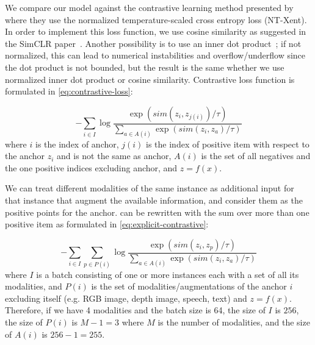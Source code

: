 \documentclass[10pt]{article} %
\newcommand{\todokdinline}[1]{\todo[color=red!20,inline]{{KD: \small #1}}}
\begin{document}
We compare our model against the contrastive learning method presented by~\citet{chen2020simple} where they use the normalized
temperature-scaled cross entropy loss (NT-Xent). In order to implement this loss function, we use cosine similarity as suggested in the SimCLR paper~\citep{chen2020simple}. Another possibility is to use an inner dot product~\citep{NEURIPS2020_supervised_contrastive}; if not normalized, this can lead to numerical instabilities and overflow/underflow since the dot product is not bounded, but the result is the same whether we use normalized inner dot product or cosine similarity. Contrastive loss function is formulated in \cref{eq:contrastive-loss}:

\begin{equation}\label{eq:contrastive-loss}
    -\sum_{i \in I} \log \frac{\exp (sim(z_i , z_{j(i)}) / \tau) }{\sum_{a \in A(i)} \exp (sim(z_i, z_a) / \tau)}
\end{equation}
where $i$ is the index of anchor, $j(i)$ is the index of positive item with respect to the anchor $z_i$ and is not the same as anchor, $A(i)$ is the set of all negatives and the one positive indices excluding anchor, and $z = f(x)$.

We can treat different modalities of the same instance as additional input for that instance that augment the available information, and consider them as the positive points for the anchor.
 can be rewritten with the sum over more than one positive item as formulated in \cref{eq:explicit-contrastive}:


\begin{equation}\label{eq:explicit-contrastive}
    - \sum_{i \in I} \sum_{p \in P(i)} \log \frac{\exp (sim(z_i , z_{p})/ \tau) }{
    \sum_{a \in A(i)} \exp (sim(z_i, z_a) / \tau)}
\end{equation}
where $I$ is a batch consisting of one or more instances each with a set of all its modalities, and $P(i)$ is the set of modalities/augmentations of the anchor $i$ excluding itself (e.g. RGB image, depth image, speech, text) and $z = f(x)$. Therefore, if we have 4 modalities and the batch size is 64, the size of $I$ is $256$, the size of $P(i)$ is $M-1 = 3$ where $M$ is the number of modalities, and the size of $A(i)$ is $256 - 1 = 255$.
\end{document}
